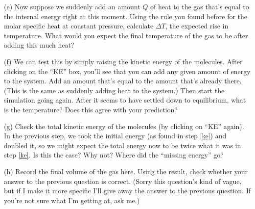 \answerspace{1in}

(e) Now suppose we suddenly add an amount $Q$ of heat to the gas that's
equal to the internal energy right at this moment.  Using the rule you
found before for the molar specific heat at constant pressure, calculate
$\Delta T$, the expected rise in temperature.  What would you expect the
final temperature of the gas to be after adding this much heat?

\answerspace{1.5in}

(f) We can test this by simply raising the kinetic energy of the 
molecules.  After clicking on the ``KE'' box, you'll see that you can
add any given amount of energy to the system.  Add an amount that's
equal to the amount that's already there.  (This is the
same as suddenly adding heat to the system.) Then start the simulation going
again.  After it seems to have settled down to equilibrium, what is the
temperature?  Does this agree with your prediction?

\answerspace{1.5in}

(g) Check the total kinetic energy of the molecules (by clicking on ``KE''
again).  In the previous step, we took the initial energy (as found
in step \ref{ke}) and doubled it, so we might expect the total energy
now to be twice what it was in step \ref{ke}.  Is this the case?  Why not?
Where did the ``missing energy'' go?

\answerspace{1in}

(h) Record the final volume of the gas here.  Using the result, check
whether your answer to the previous question is correct.  (Sorry
this question's kind of vague, but if I make it more specific I'll
give away the answer to the previous question.  If you're not sure
what I'm getting at, ask me.)
